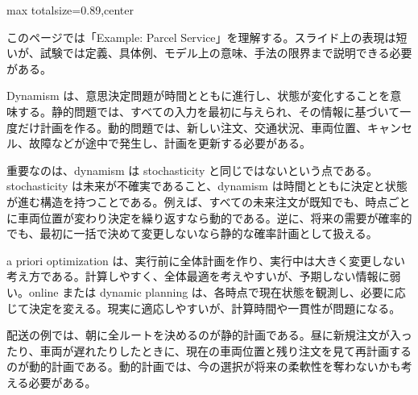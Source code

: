 \begin{minipage}[t]{0.58\textwidth}
\begin{adjustbox}{max totalsize={\textwidth}{0.89\textheight},center}
\begin{minipage}{\textwidth}\scriptsize
{}このページでは「Example: Parcel Service」を理解する。スライド上の表現は短いが、試験では定義、具体例、モデル上の意味、手法の限界まで説明できる必要がある。\par
Dynamism は、意思決定問題が時間とともに進行し、状態が変化することを意味する。静的問題では、すべての入力を最初に与えられ、その情報に基づいて一度だけ計画を作る。動的問題では、新しい注文、交通状況、車両位置、キャンセル、故障などが途中で発生し、計画を更新する必要がある。\par
重要なのは、dynamism は stochasticity と同じではないという点である。stochasticity は未来が不確実であること、dynamism は時間とともに決定と状態が進む構造を持つことである。例えば、すべての未来注文が既知でも、時点ごとに車両位置が変わり決定を繰り返すなら動的である。逆に、将来の需要が確率的でも、最初に一括で決めて変更しないなら静的な確率計画として扱える。\par
a priori optimization は、実行前に全体計画を作り、実行中は大きく変更しない考え方である。計算しやすく、全体最適を考えやすいが、予期しない情報に弱い。online または dynamic planning は、各時点で現在状態を観測し、必要に応じて決定を変える。現実に適応しやすいが、計算時間や一貫性が問題になる。\par
配送の例では、朝に全ルートを決めるのが静的計画である。昼に新規注文が入ったり、車両が遅れたりしたときに、現在の車両位置と残り注文を見て再計画するのが動的計画である。動的計画では、今の選択が将来の柔軟性を奪わないかも考える必要がある。\par

\end{minipage}
\end{adjustbox}
\end{minipage}
